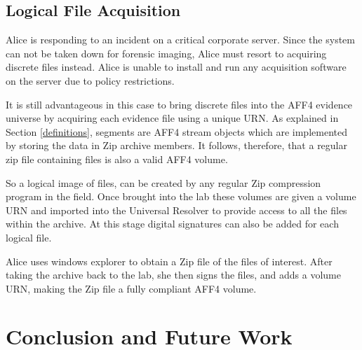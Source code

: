 \documentclass[10pt, conference]{IEEEtran}
\begin{document}


\subsection{Logical File Acquisition}
Alice is responding to an incident on a critical corporate
server. Since the system can not be taken down for forensic imaging,
Alice must resort to acquiring discrete files instead. Alice is unable
to install and run any acquisition software on the server due to
policy restrictions.

It is still advantageous in this case to bring discrete files into the
AFF4 evidence universe by acquiring each evidence file using a unique
URN. As explained in Section \ref{definitions}, segments are AFF4 stream
objects which are implemented by storing the data in Zip archive
members. It follows, therefore, that a regular zip file containing
files is also a valid AFF4 volume.

So a logical image of files, can be created by any regular Zip
compression program in the field. Once brought into the lab these
volumes are given a volume URN and imported into the Universal
Resolver to provide access to all the files within the archive. At
this stage digital signatures can also be added for each logical file.

Alice uses windows explorer to obtain a Zip file of the files of
interest. After taking the archive back to the lab, she then signs the
files, and adds a volume URN, making the Zip file a fully compliant
AFF4 volume.

\section{Conclusion and Future Work}
\end{document}
